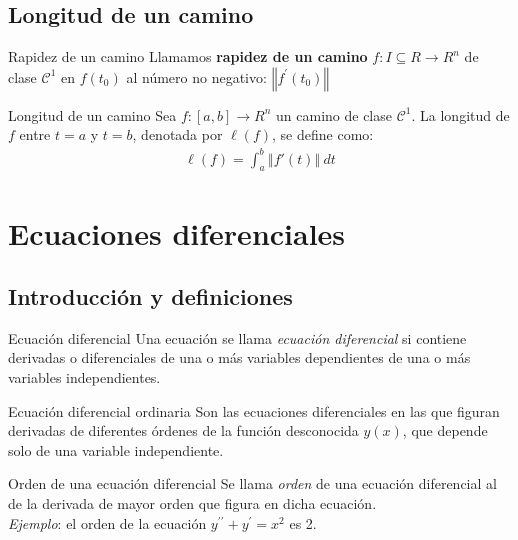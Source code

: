 \documentclass[a4paper, twoside]{article}
\numberwithin{equation}{section}
\numberwithin{figure}{section}
\numberwithin{table}{section}
\begin{document}
\subsection{Longitud de un camino}
\begin{definicion*}{Rapidez de un camino}
	Llamamos \textbf{rapidez de un camino} $f:I\subseteq R \to R^n$ de clase $\mathcal{C}^{1}$ en $f(t_0)$ al número no negativo: $\left\Vert f^\prime(t_0)\right\Vert$
\end{definicion*}

\begin{definicion*}{Longitud de un camino}
	Sea $f:[a,b] \to R^n$ un camino de clase $\mathcal{C}^{1}$. La longitud de $f$ entre $t=a$ y $t=b$, denotada por $\ell(f)$, se define como:
	\begin{align}
		\ell(f)=\int_{a}^{b}\left\Vert f'(t)\right\Vert \: dt
	\end{align}
\end{definicion*}

\newpage
\section{Ecuaciones diferenciales}
\subsection{Introducción y definiciones}
\begin{definicion*}{Ecuación diferencial}
	Una ecuación se llama \emph{ecuación diferencial} si contiene derivadas o diferenciales de una o más variables dependientes de una o más variables independientes.
\end{definicion*}

\begin{definicion*}{Ecuación diferencial ordinaria}
	Son las ecuaciones diferenciales en las que figuran derivadas de diferentes órdenes de la función desconocida $y(x)$, que depende solo de una variable independiente.
\end{definicion*}

\begin{definicion*}{Orden de una ecuación diferencial}
	Se llama \emph{orden} de una ecuación diferencial al de la derivada de mayor orden que figura en dicha ecuación.\\
			
	\emph{Ejemplo}: el orden de la ecuación $y^{\prime\prime}+y^\prime=x^2$ es 2.
\end{definicion*}
\end{document}
